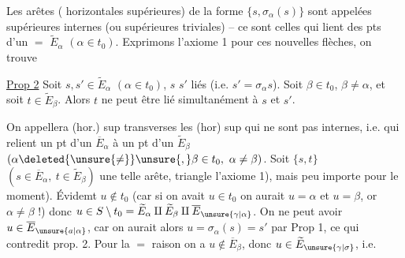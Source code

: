 Les arêtes ( horizontales supérieures) de la forme $\{s,\sigma_\alpha(s)\}$ sont appelées supérieures internes (ou supérieures triviales) -- ce sont celles qui lient des pts d'un $=$ $\widetilde E_\alpha$ $(\alpha\in t_0)$. Exprimons l'axiome 1 pour ces nouvelles flèches, on trouve

\noindent\vrule\hspace{.5em}\begin{minipage}{.89\linewidth}\uline{Prop 2} \quad Soit $s,s'\in\widetilde E_\alpha$ $(\alpha\in t_0)$, $s$  $s'$ liés (i.e. $s'=\sigma_\alpha s$). Soit $\beta\in t_0$, $\beta\ne\alpha$, et soit $t\in\widetilde E_\beta$. Alors $t$ ne peut être lié simultanément à $s$ et $s'$.\end{minipage}

On appellera  (hor.) sup transverses les  (hor) sup qui ne sont pas internes, i.e. qui  relient un pt d'un $\overline E_\alpha$ à un pt d'un $\widetilde E_\beta$ $(\alpha\deleted{\unsure{\ne}}\unsure{,}\beta\in t_0,\ \alpha\ne\beta)$. Soit $\{s,t\}$ $(s\in\overline E_\alpha,\ t\in\widetilde E_\beta)$ une telle arête,    triangle    l'axiome 1), mais peu importe pour le moment). Évidemt $u\notin t_0$ (car si on avait $u\in t_0$ on  aurait $u=\alpha$ et $u=\beta$, or $\alpha\ne\beta$ !) donc $u\in S\setminus t_0=\widetilde E_\alpha\amalg\widetilde E_\beta\amalg\overline E_{\unsure{\gamma|\alpha}}$. On ne peut avoir $u\in\overline E_{\unsure{a|\alpha}}$, car on aurait alors $u=\sigma_\alpha(s)=s'$ par Prop 1, ce qui contredit prop. 2. Pour la $=$ raison on  a $u\notin\overline E_\beta$, donc $u\in\widetilde E_{\unsure{\gamma|\sigma}}$, i.e.
